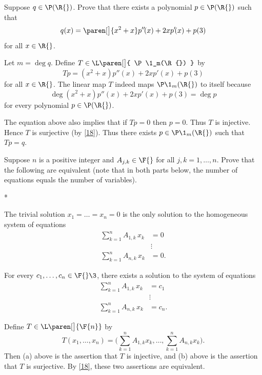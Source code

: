 \exercise
Suppose $q \in \P(\R{})$. Prove that there exists a polynomial $p \in \P(\R{})$ such that
\[
q(x) = \paren[\big]{x^2 + x} p'' \! (x) +2x p' \! (x) + p(3)
\]
for all $x \in \R{}$.

\begin{Solution}
Let $m = \deg q$. Define $T \in \L\paren[\big]{ \P\1_m(\R{}) }$ by
\[
Tp = (x^2 + x) p'' \! (x) + 2 x p' \! (x) + p(3)
\]
for all $x \in \R{}$. The linear map $T$ indeed maps $\P\1_m(\R{})$ to itself because
\[
\deg (x^2 + x) p'' \! (x) + 2 x p' \! (x) + p(3) = \deg p
\]
for every polynomial $p \in \P(\R{})$.

 The equation above also implies that if $Tp = 0$ then $p = 0$. Thus $T$ is injective. Hence $T$ is surjective (by \ref{18}). Thus there exists $p \in \P\1_m(\R{})$ such that $Tp = q$.
\end{Solution}

\exercise
Suppose $n$ is a positive integer and $A_{j,k} \in \F{}$ for all $j,k = 1, \dots, n$.
Prove that the following are equivalent (note that in both parts below, the number of equations equals the number of  variables).
\begin{subtheorem}*
\item
The trivial solution $x_1 = \dots = x_n = 0$ is the only solution to the
homogeneous system of equations
\begin{align*}
\sum_{k=1}^n A_{1,k} \, x_k &= 0 \\
& \vdots \\
\sum_{k=1}^n A_{n,k} \, x_k &= 0.
\end{align*}

\item
For every $c_1, \dots, c_n \in \F{}\3$, there exists a solution to the system of
equations
\begin{align*}
\sum_{k=1}^n A_{1,k} \, x_k &= c_1 \\
& \vdots \\
\sum_{k=1}^n A_{n,k} \, x_k &= c_n.
\end{align*}
\end{subtheorem}

\begin{Solution}
Define $T \in \L\paren[\big]{\F{n}}$ by
\[
T(x_1, \dots, x_n) =
\bigl(\sum_{k=1}^n A_{1,k}x_k, \dots, \sum_{k=1}^n A_{n,k}x_k\bigr).
\]
Then (a) above is the assertion that $T$ is injective, and (b) above is the
assertion that $T$ is surjective.  By \ref{18}, these two assertions are equivalent.
\end{Solution}


